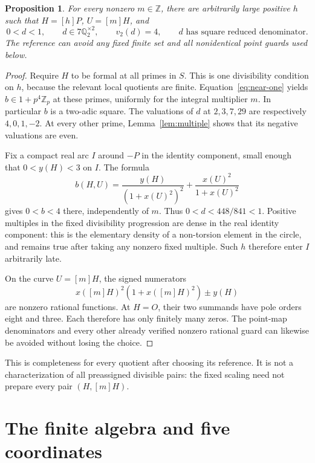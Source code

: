 \documentclass[11pt]{article}
\newtheorem{proposition}[theorem]{Proposition}
\newcommand{\Q}{\mathbb Q}
\newcommand{\Z}{\mathbb Z}
\begin{document}
\begin{proposition}\label{prop:prepare}
For every nonzero \(m\in\Z\), there are arbitrarily large positive
\(h\) such that \(H=[h]P\), \(U=[m]H\), and
\begin{equation}\label{eq:prepared}
 0<d<1,\qquad d\in7\Q_2^{\times2},\qquad v_2(d)=4,\qquad
 d\text{ has square reduced denominator}.
\end{equation}
The reference can avoid any fixed finite set and all nonidentical
point guards used below.
\end{proposition}
\begin{proof}
Require \(H\) to be formal at all primes in \(S\). This is one
divisibility condition on \(h\), because the relevant local
quotients are finite. Equation~\eqref{eq:near-one} yields
\(b\in1+p^4\Z_p\) at these primes, uniformly for the integral
multiplier \(m\). In particular \(b\) is a two-adic square.
The valuations of \(d\) at \(2,3,7,29\) are respectively
\(4,0,1,-2\). At every other prime, Lemma~\ref{lem:multiple}
shows that its negative valuations are even.

Fix a compact real arc \(I\) around \(-P\) in the identity
component, small enough that \(0<y(H)<3\) on \(I\). The formula
\[
 b(H,U)=\frac{y(H)}{(1+x(U)^2)^2}
             +\frac{x(U)^2}{1+x(U)^2}
\]
gives \(0<b<4\) there, independently of \(m\). Thus
\(0<d<448/841<1\).
Positive multiples in the fixed divisibility progression are dense
in the real identity component: this is the elementary density of
a non-torsion element in the circle, and remains true after taking
any nonzero fixed multiple. Such \(h\) therefore enter \(I\)
arbitrarily late.

On the curve \(U=[m]H\), the signed numerators
\[
             x([m]H)^2(1+x([m]H)^2)\pm y(H)
\]
are nonzero rational functions. At \(H=O\), their two summands
have pole orders eight and three. Each therefore has only finitely
many zeros. The point-map denominators and every other already
verified nonzero rational guard can likewise be avoided without
losing the choice.
\end{proof}

This is completeness for every quotient after choosing its reference.
It is not a characterization of all preassigned divisible pairs:
the fixed scaling need not prepare every pair \((H,[m]H)\).

\section{The finite algebra and five coordinates}
\end{document}
